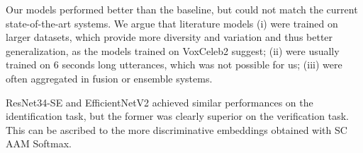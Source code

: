 \documentclass[conference]{IEEEtran}
\begin{document}
Our models performed better than the baseline, but could not match the current state-of-the-art systems. We argue that literature models (i) were trained on larger datasets, which provide more diversity and variation and thus better generalization, as the models trained on VoxCeleb2 suggest; (ii) were usually trained on 6 seconds long utterances, which was not possible for us; (iii) were often aggregated in fusion or ensemble systems.

ResNet34-SE and EfficientNetV2 achieved similar performances on the identification task, but the former was clearly superior on the verification task. This can be ascribed to the more discriminative embeddings obtained with SC AAM Softmax. 

\end{document}
